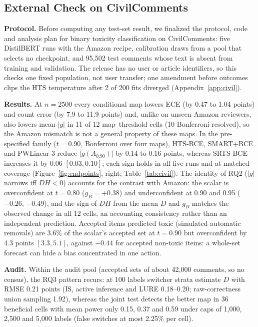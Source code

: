 \documentclass[sigconf,anonymous,review]{acmart}
\begin{document}
\subsection{External Check on CivilComments}
\label{sec:civil}
\textbf{Protocol.} Before computing any test-set result, we finalized the protocol, code and
analysis plan for binary toxicity classification on CivilComments: five DistilBERT runs with the Amazon recipe, calibration draws from a
pool that selects no checkpoint, and 95{,}502 test comments whose text is
absent from training and validation. The release has no
user or article identifiers, so this checks one fixed population, not
user transfer; one amendment before outcomes clips the HTS temperature
after 2 of 200 fits diverged (Appendix~\ref{app:civil}).

\textbf{Results.} At $n{=}2500$ every conditional map lowers ECE (by 0.47
to 1.04 points) and count error (by 7.9 to 11.9 points) and, unlike on
unseen Amazon reviewers, also lowers mean $|g|$ in 11 of 12
map--threshold cells (10 Bonferroni-resolved), so the Amazon mismatch is not
a general property of these maps. In the pre-specified
family ($t{=}0.90$, Bonferroni over four maps), HTS-BCE, SMART+BCE and
PWLinear-3 reduce $|g(A_{0.90})|$ by 0.14 to 0.16 points, whereas
SRTS-BCE increases it by 0.06 $[0.03,0.10]$; each sign holds in all five runs and at matched coverage
(Figure~\ref{fig:endpoints}, right; Table~\ref{tab:civil}). The identity of RQ2 ($|g|$ narrows iff $DH<0$) accounts for the contrast with Amazon: the scalar is overconfident at
$t{=}0.80$ ($g_B{=}{+}0.38$) and underconfident at 0.90 and 0.95
($-0.26$, $-0.49$), and the sign of $DH$ from the mean $D$ and $g_B$
matches the observed change in all 12 cells, an accounting consistency
rather than an independent prediction.
Accepted items predicted toxic (simulated automatic removals) are 3.6\% of the
scalar's accepted set at $t{=}0.90$ but overconfident by 4.3 points
$[3.3,5.1]$, against $-0.44$ for accepted non-toxic items: a whole-set
forecast can hide a bias concentrated in one action.

\textbf{Audit.} Within the audit pool (accepted sets of about 42{,}000
comments, so no census), the RQ3 pattern recurs: at 100 labels switcher
strata estimate $D$ with RMSE 0.21 points (IS, active inference and LURE
0.18--0.20; raw-correctness union sampling 1.92), whereas the joint test
detects the better map in 36 beneficial cells with mean power only 0.15,
0.37 and 0.59 under caps of 1{,}000, 2{,}500 and 5{,}000 labels (false
switches at most 2.25\% per cell).
\end{document}
